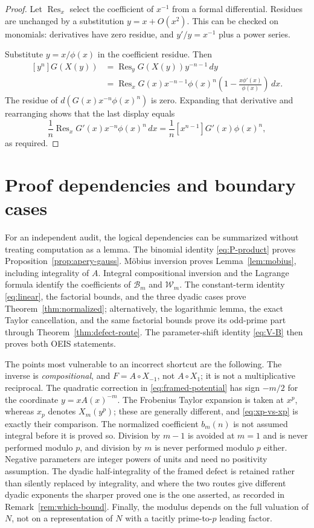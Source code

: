 \documentclass[11pt,letterpaper]{article}
\numberwithin{equation}{section}
\theoremstyle{definition}
\newcommand{\Bn}{\mathcal B}
\newcommand{\Wm}{\mathcal W}
\begin{document}
\begin{proof}
Let $\operatorname{Res}_x$ select the coefficient of $x^{-1}$ from a
formal differential. Residues are unchanged by a substitution
$y=x+O(x^2)$. This can be checked on monomials: derivatives have zero
residue, and $y'/y=x^{-1}$ plus a power series.

Substitute $y=x/\phi(x)$ in the coefficient residue. Then
\[
\begin{aligned}
[y^n]G(X(y))
&=\operatorname{Res}_y G(X(y))y^{-n-1}\,dy\\
&=\operatorname{Res}_x
G(x)x^{-n-1}\phi(x)^n
\left(1-\frac{x\phi'(x)}{\phi(x)}\right)\,dx.
\end{aligned}
\]
The residue of $d(G(x)x^{-n}\phi(x)^n)$ is zero. Expanding that
derivative and rearranging shows that the last display equals
\[
\frac1n\operatorname{Res}_x G'(x)x^{-n}\phi(x)^n\,dx
=\frac1n[x^{n-1}]G'(x)\phi(x)^n,
\]
as required.
\end{proof}

\section{Proof dependencies and boundary cases}\label{app:audit}

For an independent audit, the logical dependencies can be summarized
without treating computation as a lemma. The binomial identity
\eqref{eq:P-product} proves Proposition~\ref{prop:apery-gauss}.
M\"obius inversion proves Lemma~\ref{lem:mobius}, including integrality of
$A$. Integral compositional inversion and the Lagrange formula identify
the coefficients of $\Bn_m$ and $\Wm_m$. The constant-term identity
\eqref{eq:linear}, the factorial bounds, and the three dyadic cases prove
Theorem~\ref{thm:normalized}; alternatively, the logarithmic lemma, the
exact Taylor cancellation, and the same factorial bounds prove its
odd-prime part through Theorem~\ref{thm:defect-route}. The parameter-shift
identity \eqref{eq:V-B} then proves both OEIS statements.

The points most vulnerable to an incorrect shortcut are the following.
The inverse is \emph{compositional}, and $F=A\circ X_{-1}$, not
$A\circ X_{1}$; it is not a multiplicative reciprocal. The quadratic
correction in \eqref{eq:framed-potential} has sign $-m/2$ for the
coordinate $y=xA(x)^{-m}$. The Frobenius Taylor expansion is taken at
$x^p$, whereas $x_p$ denotes $X_m(y^p)$; these are generally different,
and \eqref{eq:xp-vs-xp} is exactly their comparison. The normalized
coefficient $b_m(n)$ is not assumed integral before it is proved so.
Division by $m-1$ is avoided at $m=1$ and is never performed modulo $p$,
and division by $m$ is never performed modulo $p$ either. Negative
parameters are integer powers of units and need no positivity assumption.
The dyadic half-integrality of the framed defect is retained rather than
silently replaced by integrality, and where the two routes give different
dyadic exponents the sharper proved one is the one asserted, as recorded
in Remark~\ref{rem:which-bound}. Finally, the modulus depends on the full
valuation of $N$, not on a representation of $N$ with a tacitly
prime-to-$p$ leading factor.
\end{document}
